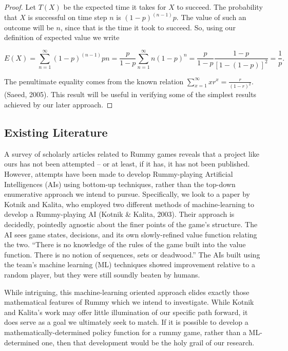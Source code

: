 \documentclass[letter,12pt]{article}
\begin{document}
\begin{proof}
Let $T(X)$  be the expected time it takes for $X$ to succeed. The probability that $X$ is successful on time step $n$ is $(1-p)^{(n-1)} p$. The value of such an outcome will be $n$, since that is the time it took to succeed. So, using our definition of expected value we write 

$$E(X) = \sum_{n=1}^{\infty} (1-p)^{(n-1)} p n = \frac{p}{1-p} \sum_{n=1}^{\infty} n (1-p)^n =
	\frac{p}{1-p} \frac{1-p}{[1-(1-p)]^2} = \frac{1}{p}. $$

The penultimate equality comes from the known relation $\sum_{x=1}^{\infty} x r^x = \frac{r}{(1-r)^2}$. (Saeed, 2005). This result will be useful in verifying some of the simplest results achieved by our later approach.

\end{proof}

\subsection{Existing Literature}

 A survey of scholarly articles related to Rummy games reveals that a project like ours has not been attempted – or at least, if it has, it has not been published. However, attempts have been made to develop Rummy-playing Artificial Intelligences (AIs) using bottom-up techniques, rather than the top-down enumerative approach we intend to pursue. Specifically, we look to a paper by Kotnik and Kalita, who employed two different methods of machine-learning to develop a Rummy-playing AI (Kotnik \& Kalita, 2003). Their approach is decidedly, pointedly agnostic about the finer points of the game’s structure. The AI sees game states, decisions, and its own slowly-refined value function relating the two. “There is no knowledge of the rules of the game built into the value function. There is no notion of sequences, sets or deadwood.” The AIs built using the team’s machine learning (ML) techniques showed improvement relative to a random player, but they were still soundly beaten by humans. 

While intriguing, this machine-learning oriented approach elides exactly those mathematical features of Rummy which we intend to investigate. While Kotnik and Kalita’s work may offer little illumination of our specific path forward, it does serve as a goal we ultimately seek to match. If it is possible to develop a mathematically-determined policy function for a rummy game, rather than a ML-determined one, then that development would be the holy grail of our research.  
 
\end{document}
